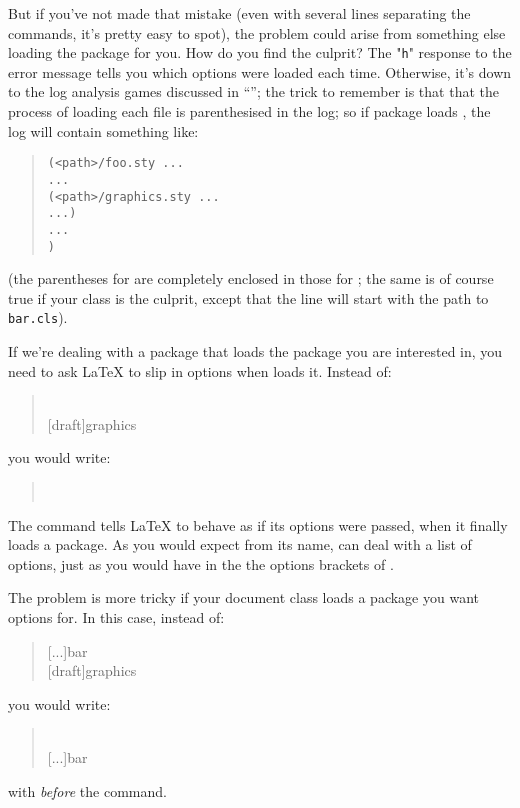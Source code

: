 But if you've not made that mistake (even with several lines
separating the  commands, it's pretty easy to spot),
the problem could arise from something else loading the package for
you.  How do you find the culprit?  The "\texttt{h}" response to the
error message tells you which options were loaded each time.
Otherwise, it's down to the log analysis games discussed in %
``''; the trick to remember
is that that the process of loading each file is parenthesised in the
log; so if package  loads , the log
will contain something like:
\begin{quote}
\begin{verbatim}
(<path>/foo.sty ...
...
(<path>/graphics.sty ...
...)
...
)
\end{verbatim}
\end{quote}
(the parentheses for  are completely enclosed in
those for ; the same is of course true if your class
 is the culprit, except that the line will start with the
path to \texttt{bar.cls}).

If we're dealing with a package that loads the package you are
interested in, you need to ask \LaTeX{} to slip in options when
 loads it.  Instead of:
\begin{quote}
\\
[draft]{graphics}
\end{quote}
you would write:
\begin{quote}
\\
\end{quote}
The command  tells \LaTeX{} to behave as if
its options were passed, when it finally loads a package.  As you would
expect from its name,  can deal with a list
of options, just as you would have in the the options brackets of
.

The problem is more tricky if your document class loads a package you
want options for.  In this case, instead of:
\begin{quote}
[...]{bar}\\
[draft]{graphics}
\end{quote}
you would write:
\begin{quote}
\\
[...]{bar}
\end{quote}
with  \emph{before} the 
command.

